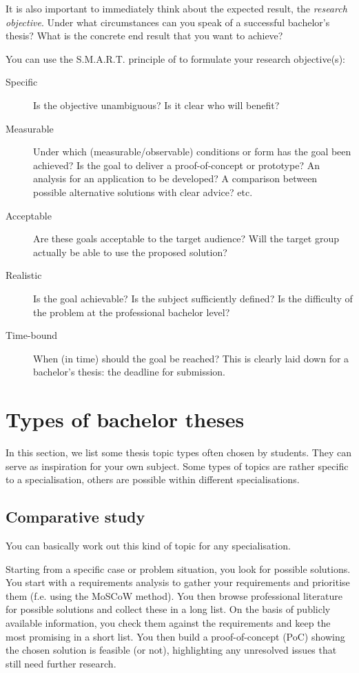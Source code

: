 It is also important to immediately think about the expected result, the \textit{research objective}. Under what circumstances can you speak of a successful bachelor's thesis? What is the concrete end result that you want to achieve?

You can use the S.M.A.R.T. principle of \autocite{UchelenJungjohann2003} to formulate your research objective(s):

\begin{description}
    \item[Specific] Is the objective unambiguous? Is it clear who will benefit?
    \item[Measurable] Under which (measurable/observable) conditions or form has the goal been achieved? Is the goal to deliver a proof-of-concept or prototype? An analysis for an application to be developed? A comparison between possible alternative solutions with clear advice? etc.
    \item[Acceptable] Are these goals acceptable to the target audience? Will the target group actually be able to use the proposed solution?
    \item[Realistic] Is the goal achievable? Is the subject sufficiently defined? Is the difficulty of the problem at the professional bachelor level?
    \item[Time-bound] When (in time) should the goal be reached? This is clearly laid down for a bachelor's thesis: the deadline for submission. 
\end{description}

\section{Types of bachelor theses}
\label{sec:types_of_theses}
In this section, we list some thesis topic types often chosen by students. They can serve as inspiration for your own subject. Some types of topics are rather specific to a specialisation, others are possible within different specialisations.

\subsection{Comparative study}
\label{ssec:thesis_type_comparative_study}

You can basically work out this kind of topic for any specialisation. 

Starting from a specific case or problem situation, you look for possible
solutions. You start with a requirements analysis to gather your requirements and prioritise them (f.e. using the MoSCoW method). You then browse professional literature for possible solutions and collect these in a long list. On the basis of publicly available information, you check them against the requirements and keep the most promising in a short list. You then build a proof-of-concept (PoC) showing the chosen solution is feasible (or not), highlighting any unresolved issues that still need further research.

